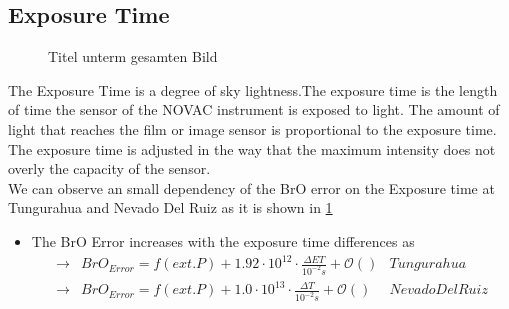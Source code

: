 \documentclass  [
  paper    = a4,
  BCOR     = 10mm,
  twoside,
  fontsize = 12pt,
  fleqn,
  toc      = bibnumbered,
  toc      = listofnumbered,
  numbers  = noendperiod,
  headings = normal,
  listof   = leveldown,
  version  = 3.03
]                                       {scrreprt}
\begin{document}
	\subsection{Exposure Time}
	\begin{figure}		
		\caption{Titel unterm gesamten Bild}
		\label{fig:diffexptime}
	\end{figure}
	The Exposure Time is a degree of sky lightness.The  exposure time is the length of time the sensor of the NOVAC instrument is exposed to light. The amount of light that reaches the film or image sensor is proportional to the exposure time. The exposure time is adjusted in the way that the maximum intensity does not overly the capacity of the sensor.\\
	We can observe an small dependency of the BrO error on the Exposure time at Tungurahua and Nevado Del Ruiz as it is shown in \cref{fig:diffexptime}
	

	\begin{itemize}
		\item The BrO Error increases with the exposure time differences as\\
		\begin{align*}
		\rightarrow&  BrO_{Error} = f(ext. P)+ 1.92\cdot10^{12}\cdot\frac{\Delta ET}{10^{-2}s} + \mathcal{O}\left(\right) & Tungurahua\\
		\rightarrow&  BrO_{Error} = f(ext. P)+ 1.0\cdot10^{13}\cdot\frac{\Delta T}{10^{-2}s} + \mathcal{O}\left(\right) & Nevado Del Ruiz\\
		\end{align*}
	\end{itemize}
\end{document}
